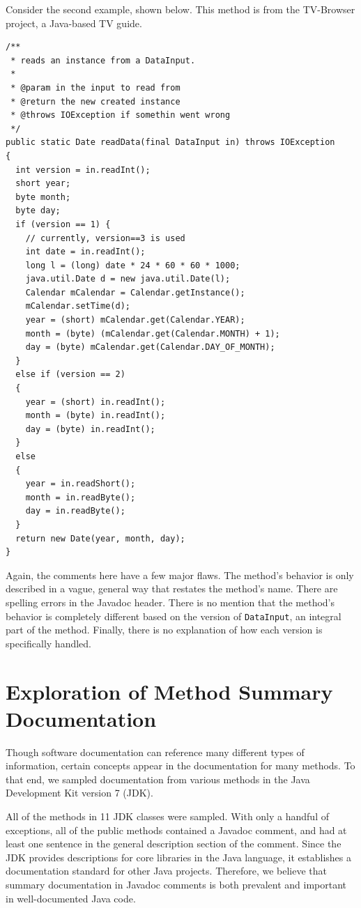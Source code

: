\documentclass[preprint]{sigplanconf}
\begin{document}
Consider the second example, shown below. This method is from the TV-Browser project, a Java-based TV guide.

\begin{lstlisting}
/**
 * reads an instance from a DataInput.
 *
 * @param in the input to read from
 * @return the new created instance
 * @throws IOException if somethin went wrong
 */
public static Date readData(final DataInput in) throws IOException
{
  int version = in.readInt();
  short year;
  byte month;
  byte day;
  if (version == 1) {
    // currently, version==3 is used
    int date = in.readInt();
    long l = (long) date * 24 * 60 * 60 * 1000;
    java.util.Date d = new java.util.Date(l);
    Calendar mCalendar = Calendar.getInstance();
    mCalendar.setTime(d);
    year = (short) mCalendar.get(Calendar.YEAR);
    month = (byte) (mCalendar.get(Calendar.MONTH) + 1);
    day = (byte) mCalendar.get(Calendar.DAY_OF_MONTH);
  }
  else if (version == 2)
  {
    year = (short) in.readInt();
    month = (byte) in.readInt();
    day = (byte) in.readInt();
  }
  else
  {
    year = in.readShort();
    month = in.readByte();
    day = in.readByte();
  }
  return new Date(year, month, day);
}
\end{lstlisting}

Again, the comments here have a few major flaws. The method's behavior is only described in a vague, general way that restates the method's name. There are spelling errors in the Javadoc header. There is no mention that the method's behavior is completely different based on the version of \verb|DataInput|, an integral part of the method. Finally, there is no explanation of how each version is specifically handled.

\section{Exploration of Method Summary Documentation}
Though software documentation can reference many different types of information, certain concepts appear in the documentation for many methods. To that end, we sampled documentation from various methods in the Java Development Kit version 7 (JDK).

All of the methods in 11 JDK classes were sampled. With only a handful of exceptions, all of the public methods contained a Javadoc comment, and had at least one sentence in the general description section of the comment. Since the JDK provides descriptions for core libraries in the Java language, it establishes a documentation standard for other Java projects. Therefore, we believe that summary documentation in Javadoc comments is both prevalent and important in well-documented Java code.
\end{document}
